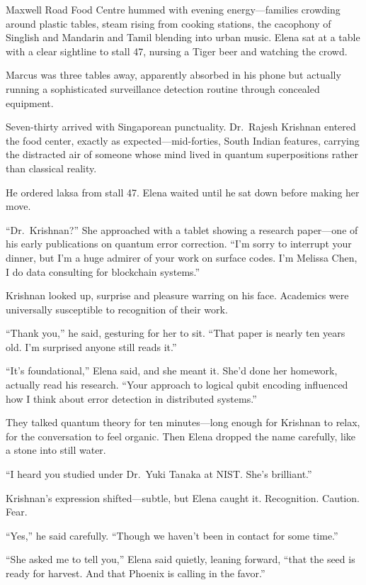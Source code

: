 \documentclass[12pt,letterpaper]{book}
\begin{document}
Maxwell Road Food Centre hummed with evening energy---families crowding around plastic tables, steam rising from cooking stations, the cacophony of Singlish and Mandarin and Tamil blending into urban music. Elena sat at a table with a clear sightline to stall 47, nursing a Tiger beer and watching the crowd.

Marcus was three tables away, apparently absorbed in his phone but actually running a sophisticated surveillance detection routine through concealed equipment.

Seven-thirty arrived with Singaporean punctuality. Dr.~Rajesh Krishnan entered the food center, exactly as expected---mid-forties, South Indian features, carrying the distracted air of someone whose mind lived in quantum superpositions rather than classical reality.

He ordered laksa from stall 47. Elena waited until he sat down before making her move.

``Dr.~Krishnan?'' She approached with a tablet showing a research paper---one of his early publications on quantum error correction. ``I'm sorry to interrupt your dinner, but I'm a huge admirer of your work on surface codes. I'm Melissa Chen, I do data consulting for blockchain systems.''

Krishnan looked up, surprise and pleasure warring on his face. Academics were universally susceptible to recognition of their work.

``Thank you,'' he said, gesturing for her to sit. ``That paper is nearly ten years old. I'm surprised anyone still reads it.''

``It's foundational,'' Elena said, and she meant it. She'd done her homework, actually read his research. ``Your approach to logical qubit encoding influenced how I think about error detection in distributed systems.''

They talked quantum theory for ten minutes---long enough for Krishnan to relax, for the conversation to feel organic. Then Elena dropped the name carefully, like a stone into still water.

``I heard you studied under Dr.~Yuki Tanaka at NIST. She's brilliant.''

Krishnan's expression shifted---subtle, but Elena caught it. Recognition. Caution. Fear.

``Yes,'' he said carefully. ``Though we haven't been in contact for some time.''

``She asked me to tell you,'' Elena said quietly, leaning forward, ``that the seed is ready for harvest. And that Phoenix is calling in the favor.''
\end{document}
